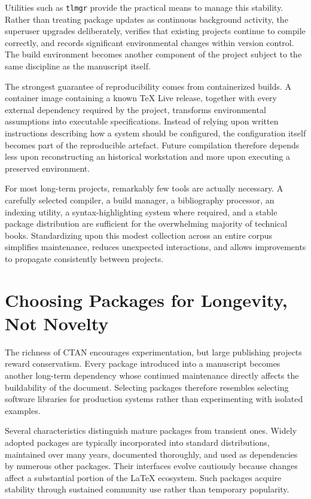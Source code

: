 Utilities such as \texttt{tlmgr} provide the practical means to manage this stability. Rather than treating package updates as continuous background activity, the superuser upgrades deliberately, verifies that existing projects continue to compile correctly, and records significant environmental changes within version control. The build environment becomes another component of the project subject to the same discipline as the manuscript itself.

The strongest guarantee of reproducibility comes from containerized builds. A container image containing a known TeX Live release, together with every external dependency required by the project, transforms environmental assumptions into executable specifications. Instead of relying upon written instructions describing how a system should be configured, the configuration itself becomes part of the reproducible artefact. Future compilation therefore depends less upon reconstructing an historical workstation and more upon executing a preserved environment.

For most long-term projects, remarkably few tools are actually necessary. A carefully selected compiler, a build manager, a bibliography processor, an indexing utility, a syntax-highlighting system where required, and a stable package distribution are sufficient for the overwhelming majority of technical books. Standardizing upon this modest collection across an entire corpus simplifies maintenance, reduces unexpected interactions, and allows improvements to propagate consistently between projects.

\hypertarget{choosing-packages-for-longevity-not-novelty}{%
\section{Choosing Packages for Longevity, Not Novelty}\label{choosing-packages-for-longevity-not-novelty}}

The richness of CTAN encourages experimentation, but large publishing projects reward conservatism. Every package introduced into a manuscript becomes another long-term dependency whose continued maintenance directly affects the buildability of the document. Selecting packages therefore resembles selecting software libraries for production systems rather than experimenting with isolated examples.

Several characteristics distinguish mature packages from transient ones. Widely adopted packages are typically incorporated into standard distributions, maintained over many years, documented thoroughly, and used as dependencies by numerous other packages. Their interfaces evolve cautiously because changes affect a substantial portion of the LaTeX ecosystem. Such packages acquire stability through sustained community use rather than temporary popularity.

